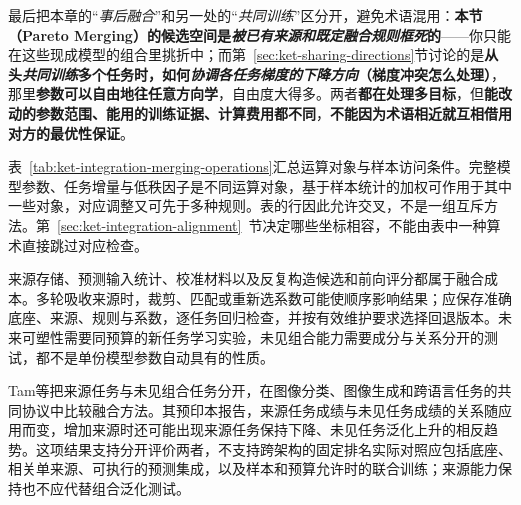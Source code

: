 最后把本章的“\emph{事后融合}”和另一处的“\emph{共同训练}”区分开，避免术语混用：\textbf{本节（Pareto Merging）的候选空间是\emph{被已有来源和既定融合规则框死}的}——你只能在这些现成模型的组合里挑折中；而第~\ref{sec:ket-sharing-directions}节讨论的是\textbf{从头\emph{共同训练}多个任务时，如何\emph{协调各任务梯度的\emph{下降方向}}（梯度冲突怎么处理）}，那里\textbf{参数可以自由地往任意方向学}，自由度大得多。两者\textbf{都在处理多目标}，但\textbf{能改动的参数范围、能用的训练证据、计算费用都不同}，\textbf{不能因为术语相近就互相借用对方的最优性保证}。

表~\ref{tab:ket-integration-merging-operations}汇总运算对象与样本访问条件。完整模型参数、任务增量与低秩因子是不同运算对象，基于样本统计的加权可作用于其中一些对象，对应调整又可先于多种规则。表的行因此允许交叉，不是一组互斥方法。第~\ref{sec:ket-integration-alignment}~节决定哪些坐标相容，不能由表中一种算术直接跳过对应检查。

来源存储、预测输入统计、校准材料以及反复构造候选和前向评分都属于融合成本。多轮吸收来源时，裁剪、匹配或重新选系数可能使顺序影响结果；应保存准确底座、来源、规则与系数，逐任务回归检查，并按有效维护要求选择回退版本。未来可塑性需要同预算的新任务学习实验，未见组合能力需要成分与关系分开的测试，都不是单份模型参数自动具有的性质。

Tam等把来源任务与未见组合任务分开，在图像分类、图像生成和跨语言任务的共同协议中比较融合方法。其预印本报告，来源任务成绩与未见任务成绩的关系随应用而变，增加来源时还可能出现来源任务保持下降、未见任务泛化上升的相反趋势。这项结果支持分开评价两者，不支持跨架构的固定排名实际对照应包括底座、相关单来源、可执行的预测集成，以及样本和预算允许时的联合训练；来源能力保持也不应代替组合泛化测试。

